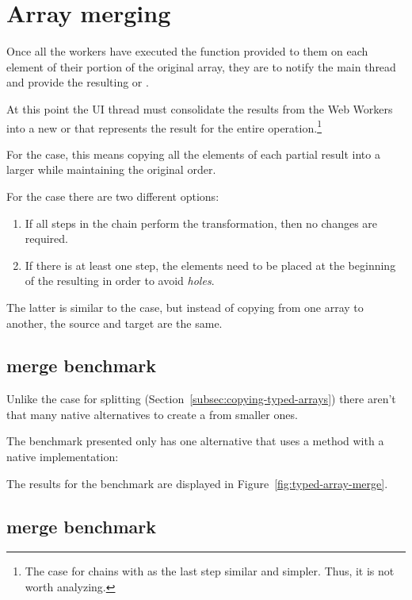 \section{Array merging}

Once all the workers have executed the function provided to them on each element of their portion of the original array, they are to notify the main thread and provide the resulting \tabuffer{} or \tsabuffer{}.

At this point the UI thread must consolidate the results from the Web Workers into a new \ttarray{} or \tstarray{} that represents the result for the entire operation.\footnote{The case for chains with  as the last step similar and simpler. Thus, it is not worth analyzing.}

For the \tabuffer{} case, this means copying all the elements of each partial result into a larger \ttarray{} while maintaining the original order.

For the \tsabuffer{} case there are two different options:
\begin{enumerate}
  \item If all steps in the chain perform the  transformation, then no changes are required.
  \item If there is at least one  step, the elements need to be placed at the beginning of the resulting \tstarray{} in order to avoid \textit{holes}.
\end{enumerate}

The latter is similar to the \tabuffer{} case, but instead of copying from one array to another, the source and target are the same.

\subsection{\ttarray{} merge benchmark}
Unlike the case for \ttarray{} splitting (Section~\ref{subsec:copying-typed-arrays}) there aren't that many native alternatives to create a \ttarray{} from smaller ones.

The benchmark presented only has one alternative that uses a method with a native implementation:

The results for the benchmark are displayed in Figure~\ref{fig:typed-array-merge}.

\subsection{\tstarray{} merge benchmark}


